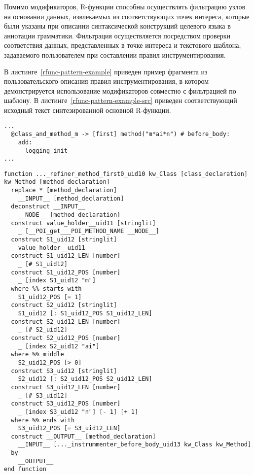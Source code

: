Помимо модификаторов, R-функции способны осуществлять фильтрацию узлов на основании данных, извлекаемых из соответствующих точек интереса, которые были указаны при описании синтаксической конструкций целевого языка в аннотации грамматики.
Фильтрация осуществляется посредством проверки соответствия данных, представленных в точке интереса и текстового шаблона, задаваемого пользователем при составлении правил инструментирования.

В листинге~\ref{rfunc-pattern-example} приведен пример фрагмента из пользовательского описания правил инструментирования, в котором демонстрируется использование модификаторов совместно с фильтрацией по шаблону.
В листинге~\ref{rfunc-pattern-example-src} приведен соответствующий исходный текст синтезированной основной R-функции.

\begin{lstlisting}[frame=single, label={rfunc-pattern-example}, caption={Пример использования текстового шаблона.}]
...
  @class_and_method_m -> [first] method("m*ai*n") # before_body:
    add:
      logging_init
...
\end{lstlisting}

\begin{lstlisting}[frame=single, language=TXL, label={rfunc-pattern-example-src}, caption={Пример синтезированной R-функции со встроенной проверкой на соответствие шаблону.}]
function ..._refiner_method_first0_uid10 kw_Class [class_declaration] kw_Method [method_declaration]
  replace * [method_declaration]
    __INPUT__ [method_declaration]
  deconstruct __INPUT__
    __NODE__ [method_declaration]
  construct value_holder__uid11 [stringlit]
    _ [__POI_get___POI_METHOD_NAME __NODE__]
  construct S1_uid12 [stringlit]
    value_holder__uid11
  construct S1_uid12_LEN [number]
    _ [# S1_uid12]
  construct S1_uid12_POS [number]
    _ [index S1_uid12 "m"] 
  where %% starts with
    S1_uid12_POS [= 1]
  construct S2_uid12 [stringlit]
    S1_uid12 [: S1_uid12_POS S1_uid12_LEN]
  construct S2_uid12_LEN [number]
    _ [# S2_uid12]
  construct S2_uid12_POS [number]
    _ [index S2_uid12 "ai"] 
  where %% middle
    S2_uid12_POS [> 0]
  construct S3_uid12 [stringlit]
    S2_uid12 [: S2_uid12_POS S2_uid12_LEN]
  construct S3_uid12_LEN [number]
    _ [# S3_uid12]
  construct S3_uid12_POS [number]
    _ [index S3_uid12 "n"] [- 1] [+ 1]
  where %% ends with
    S3_uid12_POS [= S3_uid12_LEN]
  construct __OUTPUT__ [method_declaration]
    __INPUT__ [..._instrummenter_before_body_uid13 kw_Class kw_Method]
  by
    __OUTPUT__
end function
\end{lstlisting}

